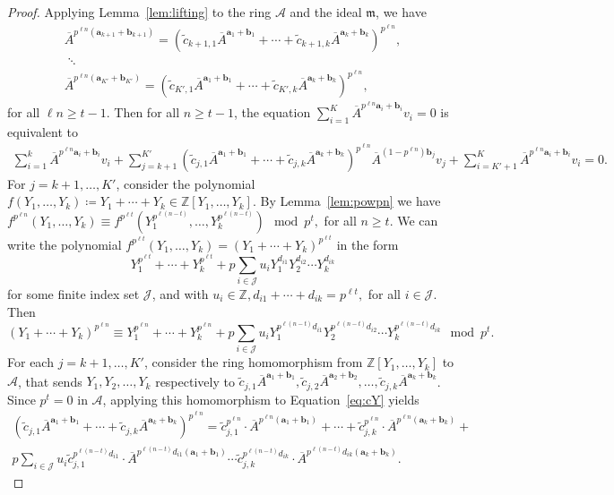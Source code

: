 \documentclass[letterpaper, 11pt, thm-restate]{article}
\numberwithin{equation}{section}
\newcommand{\Z}{\mathbb{Z}}
\newcommand{\mJ}{\mathcal{J}}
\newcommand{\mA}{\mathcal{A}}
\newcommand{\ba}{\boldsymbol{a}}
\newcommand{\bb}{\boldsymbol{b}}
\newcommand{\tc}{\widetilde{c}}
\newcommand{\oA}{\overline{A}}
\newcommand{\frm}{\mathfrak{m}}
\theoremstyle{definition}
\theoremstyle{definition}
\theoremstyle{definition}
\begin{document}
\begin{proof}
    Applying Lemma~\ref{lem:lifting} to the ring $\mA$ and the ideal $\frm$, we have
    \begin{multline*}
    \oA^{p^{\ell n}(\ba_{k+1} + \bb_{k+1})} = \left(\tc_{k+1,1} \oA^{\ba_1 + \bb_1} + \cdots + \tc_{k+1,k} \oA^{\ba_k + \bb_k} \right)^{p^{\ell n}}, \\\;\ddots\; \\
    \oA^{p^{\ell n}(\ba_{K'} + \bb_{K'})} = \left(\tc_{K',1} \oA^{\ba_1 + \bb_1} + \cdots + \tc_{K',k} \oA^{\ba_k + \bb_k} \right)^{p^{\ell n}},
    \end{multline*}
    for all $\ell n \geq t-1$.
    Then for all $n \geq t-1$, the equation $\sum_{i = 1}^K \oA^{p^{\ell n} \ba_i + \bb_i} v_i = 0$ is equivalent to
    \begin{multline}\label{eq:sumyv}
    \sum_{i = 1}^k \oA^{p^{\ell n} \ba_i + \bb_i} v_i + \sum_{j = k+1}^{K'} \left(\tc_{j,1} \oA^{\ba_1 + \bb_1} + \cdots + \tc_{j,k} \oA^{\ba_k + \bb_k} \right)^{p^{\ell n}} \oA^{(1 - p^{\ell n}) \bb_j} v_j + \sum_{i = K'+1}^K \oA^{p^{\ell n} \ba_i + \bb_i} v_i = 0.
    \end{multline}
    For $j = k+1, \ldots, K'$, consider the polynomial $f(Y_1, \ldots, Y_k) \coloneqq Y_1 + \cdots + Y_k \in \Z[Y_1, \ldots, Y_k]$.
    By Lemma~\ref{lem:powpn} we have
    $
    f^{p^{\ell n}}(Y_1, \ldots, Y_k) \equiv f^{p^{\ell t}}(Y_1^{p^{\ell (n-t)}}, \ldots, Y_k^{p^{\ell (n-t)}}) \mod p^t,
    $
    for all $n \geq t$.
    We can write the polynomial $f^{p^{\ell t}}(Y_1, \ldots, Y_k) = (Y_1 + \cdots + Y_k)^{p^{\ell t}}$ in the form
    \[
    Y_1^{p^{\ell t}} + \cdots + Y_k^{p^{\ell t}} + p \sum_{i \in \mJ} u_{i} Y_1^{d_{i1}} Y_2^{d_{i2}} \cdots Y_k^{d_{ik}}
    \]
    for some finite index set $\mJ$, and with $u_i \in \Z, d_{i1} + \cdots + d_{ik} = p^{\ell t},$ for all $i \in \mJ$.
    Then
    \begin{equation}\label{eq:cY}
    (Y_1 + \cdots + Y_k)^{p^{\ell n}} \equiv Y_1^{p^{\ell n}} + \cdots + Y_k^{p^{\ell n}} + p \sum_{i \in \mJ} u_{i} Y_1^{p^{\ell (n - t)} d_{i1}} Y_2^{p^{\ell (n - t)} d_{i2}} \cdots Y_k^{p^{\ell (n - t)} d_{ik}} \mod p^t.
    \end{equation}
    For each $j = k+1, \ldots, K'$, consider the ring homomorphism from $\Z[Y_1, \ldots, Y_k]$ to $\mA$, that sends $Y_1, Y_2, \ldots, Y_k$ respectively to $\tc_{j,1} \oA^{\ba_1 + \bb_1}, \tc_{j,2} \oA^{\ba_2 + \bb_2}, \ldots, \tc_{j,k} \oA^{\ba_k + \bb_k}$.
    Since $p^t = 0$ in $\mA$, applying this homomorphism to Equation~\eqref{eq:cY} yields
    \begin{multline}\label{eq:unfoldpln}
    \left(\tc_{j,1} \oA^{\ba_1 + \bb_1} + \cdots + \tc_{j,k} \oA^{\ba_k + \bb_k}\right)^{p^{\ell n}} = \tc_{j,1}^{p^{\ell n}} \cdot \oA^{p^{\ell n}(\ba_1 + \bb_1)} + \cdots + \tc_{j,k}^{p^{\ell n}} \cdot \oA^{p^{\ell n}(\ba_k + \bb_k)} + \\
    p \sum_{i \in \mJ} u_{i} \tc_{j,1}^{p^{\ell (n - t)} d_{i1}} \cdot \oA^{p^{\ell (n-t)}d_{i1}(\ba_1 + \bb_1)} \cdots \tc_{j,k}^{p^{\ell (n - t)} d_{ik}} \cdot \oA^{p^{\ell (n-t)}d_{ik}(\ba_k + \bb_k)}.
    \end{multline}
    

\end{proof}
\end{document}
